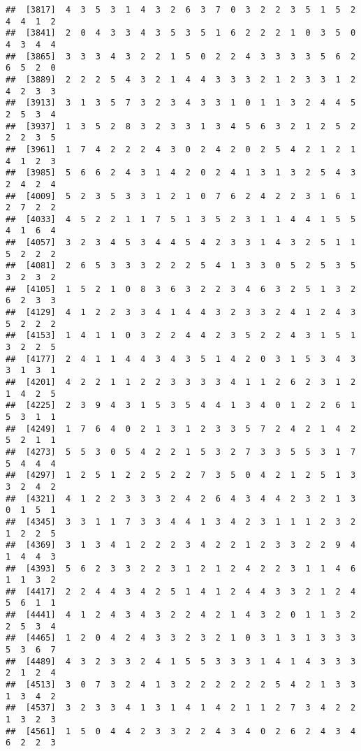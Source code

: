 \documentclass[
]{article}
\begin{document}
\begin{verbatim}
##  [3817]  4  3  5  3  1  4  3  2  6  3  7  0  3  2  2  3  5  1  5  2  4  4  1  2
##  [3841]  2  0  4  3  3  4  3  5  3  5  1  6  2  2  2  1  0  3  5  0  4  3  4  4
##  [3865]  3  3  3  4  3  2  2  1  5  0  2  2  4  3  3  3  3  5  6  2  6  5  2  0
##  [3889]  2  2  2  5  4  3  2  1  4  4  3  3  3  2  1  2  3  3  1  2  4  2  3  3
##  [3913]  3  1  3  5  7  3  2  3  4  3  3  1  0  1  1  3  2  4  4  5  2  5  3  4
##  [3937]  1  3  5  2  8  3  2  3  3  1  3  4  5  6  3  2  1  2  5  2  2  2  3  5
##  [3961]  1  7  4  2  2  2  4  3  0  2  4  2  0  2  5  4  2  1  2  1  4  1  2  3
##  [3985]  5  6  6  2  4  3  1  4  2  0  2  4  1  3  1  3  2  5  4  3  2  4  2  4
##  [4009]  5  2  3  5  3  3  1  2  1  0  7  6  2  4  2  2  3  1  6  1  2  7  2  2
##  [4033]  4  5  2  2  1  1  7  5  1  3  5  2  3  1  1  4  4  1  5  5  4  1  6  4
##  [4057]  3  2  3  4  5  3  4  4  5  4  2  3  3  1  4  3  2  5  1  1  5  2  2  2
##  [4081]  2  6  5  3  3  3  2  2  2  5  4  1  3  3  0  5  2  5  3  5  3  2  3  2
##  [4105]  1  5  2  1  0  8  3  6  3  2  2  3  4  6  3  2  5  1  3  2  6  2  3  3
##  [4129]  4  1  2  2  3  3  4  1  4  4  3  2  3  3  2  4  1  2  4  3  5  2  2  2
##  [4153]  1  4  1  1  0  3  2  2  4  4  2  3  5  2  2  4  3  1  5  1  3  2  2  5
##  [4177]  2  4  1  1  4  4  3  4  3  5  1  4  2  0  3  1  5  3  4  3  3  1  3  1
##  [4201]  4  2  2  1  1  2  2  3  3  3  3  4  1  1  2  6  2  3  1  2  1  4  2  5
##  [4225]  2  3  9  4  3  1  5  3  5  4  4  1  3  4  0  1  2  2  6  1  5  3  1  1
##  [4249]  1  7  6  4  0  2  1  3  1  2  3  3  5  7  2  4  2  1  4  2  5  2  1  1
##  [4273]  5  5  3  0  5  4  2  2  1  5  3  2  7  3  3  5  5  3  1  7  5  4  4  4
##  [4297]  1  2  5  1  2  2  5  2  2  7  3  5  0  4  2  1  2  5  1  3  3  2  4  2
##  [4321]  4  1  2  2  3  3  3  2  4  2  6  4  3  4  4  2  3  2  1  3  0  1  5  1
##  [4345]  3  3  1  1  7  3  3  4  4  1  3  4  2  3  1  1  1  2  3  2  1  2  2  5
##  [4369]  3  1  3  4  1  2  2  2  3  4  2  2  1  2  3  3  2  2  9  4  1  4  4  3
##  [4393]  5  6  2  3  3  2  2  3  1  2  1  2  4  2  2  3  1  1  4  6  1  1  3  2
##  [4417]  2  2  4  4  3  4  2  5  1  4  1  2  4  4  3  3  2  1  2  4  5  6  1  1
##  [4441]  4  1  2  4  3  4  3  2  2  4  2  1  4  3  2  0  1  1  3  2  2  5  3  4
##  [4465]  1  2  0  4  2  4  3  3  2  3  2  1  0  3  1  3  1  3  3  3  5  3  6  7
##  [4489]  4  3  2  3  3  2  4  1  5  5  3  3  3  1  4  1  4  3  3  3  2  1  2  4
##  [4513]  3  0  7  3  2  4  1  3  2  2  2  2  2  2  5  4  2  1  3  3  1  3  4  2
##  [4537]  3  2  3  3  4  1  3  1  4  1  4  2  1  1  2  7  3  4  2  2  1  3  2  3
##  [4561]  1  5  0  4  4  2  3  3  2  2  4  3  4  0  2  6  2  4  3  4  6  2  2  3

\end{verbatim}
\end{document}
